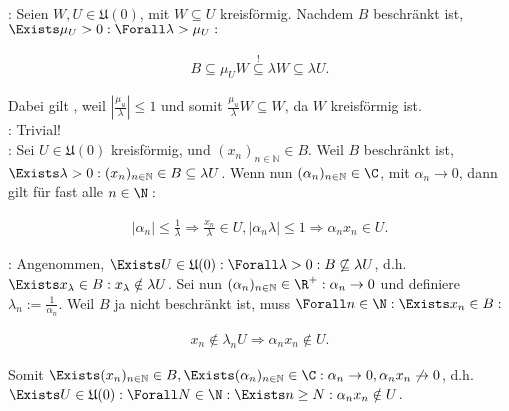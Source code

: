 \begin{solution}

:
Seien $W, U \in \mathfrak{U}(0)$, mit $W \subseteq U$ kreisförmig.
Nachdem $B$ beschränkt ist, $\Exists \mu_U > 0: \Forall \lambda > \mu_U:$

\begin{align*}
  B
  \subseteq
  \mu_U W
  \stackrel{!}{\subseteq}
  \lambda W
  \subseteq
  \lambda U.
\end{align*}

Dabei gilt \Quote{!}, weil $|\frac{\mu_u}{\lambda}| \leq 1$ und somit $\frac{\mu_u}{\lambda} W \subseteq W$, da $W$ kreisförmig ist. \\

:
Trivial! \\

:
Sei $U \in \mathfrak{U}(0)$ kreisförmig, und $(x_n)_{n\in\mathbb{N}} \in B$.
Weil $B$ beschränkt ist, $\Exists \lambda > 0: (x_n)_{n\in\mathbb{N}} \in B \subseteq \lambda U$.
Wenn nun $(\alpha_n)_{n\in\mathbb{N}} \in \C$, mit $\alpha_n \to 0$, dann gilt für fast alle $n \in \N:$

\begin{align*}
  |\alpha_n| \leq \frac{1}{\lambda}
  \Rightarrow
  \frac{x_n}{\lambda} \in U,
  |\alpha_n \lambda| \leq 1
  \Rightarrow
  \alpha_n x_n \in U.
\end{align*}

:
Angenommen, $\Exists U \in \mathfrak{U}(0): \Forall \lambda > 0: B \not \subseteq \lambda U$, d.h. $\Exists x_\lambda \in B: x_\lambda \notin \lambda U$.
Sei nun $(\alpha_n)_{n\in\mathbb{N}} \in \R^+: \alpha_n \to 0$ und definiere $\lambda_n := \frac{1}{\alpha_n}$.
Weil $B$ ja nicht beschränkt ist, muss $\Forall n \in \N: \Exists x_n \in B:$

\begin{align*}
  x_n \notin \lambda_n U
  \Rightarrow
  \alpha_n x_n \notin U.
\end{align*}

Somit $\Exists (x_n)_{n\in\mathbb{N}} \in B, \Exists (\alpha_n)_{n\in\mathbb{N}} \in \C: \alpha_n \to 0, \alpha_n x_n \not \to 0$, d.h. $\Exists U \in \mathfrak{U}(0): \Forall N \in \N: \Exists n \geq N: \alpha_n x_n \notin U$.

\end{solution}
